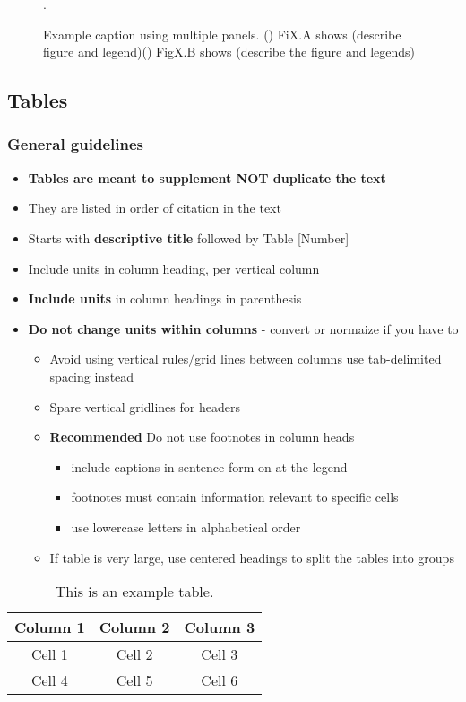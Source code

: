 \documentclass{article}
\begin{document}
	
	\begin{figure}[h]
		\centering
		\caption{Example caption using multiple panels.     () FiX.A shows (describe figure and legend)() FigX.B shows (describe the figure and legends)}.
		\label{fig:2}
	\end{figure}
	
	\subsection*{Tables}
	\subsubsection*{General guidelines}
	\begin{itemize}
		\item \textbf{Tables are meant to supplement NOT duplicate the text}
		\item They are listed in order of citation in the text
		\item Starts with \textbf{descriptive title } followed by Table [Number]
		\item Include units in column heading, per vertical column
		\item \textbf{Include units} in column headings in parenthesis
		\item \textbf{Do not change units within columns} - convert or normaize if you have to
		\begin{itemize}
			\item Avoid using vertical rules/grid lines between columns use tab-delimited spacing instead
			\item Spare vertical gridlines for headers
			\item \textbf{Recommended} Do not use footnotes in column heads
			\begin{itemize}
				\item include captions in sentence form on at the legend
				\item footnotes must contain information relevant to specific cells
				\item use lowercase letters in alphabetical order
			\end{itemize}
			\item If table is very large, use centered headings to split the tables into groups
		\end{itemize}
	\end{itemize}		
	
	
	\begin{table}[b]
		\caption{This is an example table.}    
		\centering
		\begin{tabular}{ccc}
			\hline
			Column 1 & Column 2 & Column 3 \\  
			\hline
			Cell 1 & Cell 2 & Cell 3\\ 
			Cell 4 & Cell 5 & Cell 6 \\
			\hline
		\end{tabular}
		
		\label{tab:1}
	\end{table}
	
\end{document}
